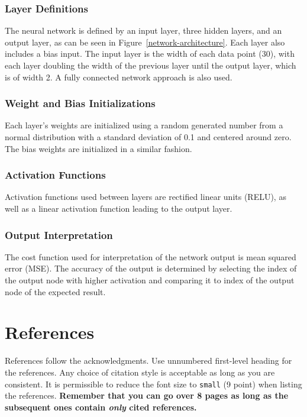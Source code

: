 \documentclass{article}
\begin{document}
 \subsubsection{Layer Definitions}

 The neural network is defined by an input layer, three hidden layers, and an output layer, as can 
 be seen in Figure~\ref{network-architecture}. Each layer also includes a bias input. The input layer is the 
 width of each data point (30), with each layer doubling the width of the previous layer until the 
 output layer, which is of width 2. A fully connected network approach is also used.

\subsubsection{Weight and Bias Initializations}

 Each layer’s weights are initialized using a random generated number from a normal distribution 
 with a standard deviation of  0.1 and centered around zero. The bias weights are initialized in a 
 similar fashion.

\subsubsection{Activation Functions}

 Activation functions used between layers are rectified linear units (RELU), as well as a linear 
 activation function leading to the output layer.

\subsubsection{Output Interpretation}

 The cost function used for interpretation of the network output is mean squared error (MSE). 
 The accuracy of the output is determined by selecting the index of the output node with higher 
 activation and comparing it to index of the output node of the expected result.

\section*{References}

References follow the acknowledgments. Use unnumbered first-level
heading for the references. Any choice of citation style is acceptable
as long as you are consistent. It is permissible to reduce the font
size to \verb+small+ (9 point) when listing the references. {\bf
  Remember that you can go over 8 pages as long as the subsequent ones contain
  \emph{only} cited references.}
\medskip
\end{document}
